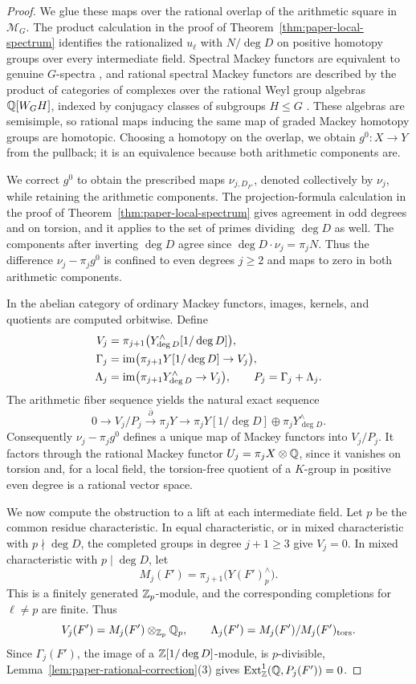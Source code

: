 \begin{proof}
We glue these maps over the rational overlap of the arithmetic square in $\mathscr M_G$.
The product calculation in the proof of Theorem~\ref{thm:paper-local-spectrum} identifies the rationalized $u_\ell$ with $N/\deg D$ on positive homotopy groups over every intermediate field.
Spectral Mackey functors are equivalent to genuine $G$-spectra \cite{BarwickSpectralMackey}, and rational spectral Mackey functors are described by the product of categories of complexes over the rational Weyl group algebras $\mathbb Q[W_GH]$, indexed by conjugacy classes of subgroups $H\le G$ \cite{BarnesRational2009}.
These algebras are semisimple, so rational maps inducing the same map of graded Mackey homotopy groups are homotopic.
Choosing a homotopy on the overlap, we obtain $g^0\colon X\to Y$ from the pullback; it is an equivalence because both arithmetic components are.

We correct $g^0$ to obtain the prescribed maps $\nu_{j,D_{F'}}$, denoted collectively by $\nu_j$, while retaining the arithmetic components.
The projection-formula calculation in the proof of Theorem~\ref{thm:paper-local-spectrum} gives agreement in odd degrees and on torsion, and it applies to the set of primes dividing $\deg D$ as well.
The components after inverting $\deg D$ agree since $\deg D\cdot\nu_j=\pi_jN$.
Thus the difference $\nu_j-\pi_jg^0$ is confined to even degrees $j\ge2$ and maps to zero in both arithmetic components.

In the abelian category of ordinary Mackey functors, images, kernels, and quotients are computed orbitwise.
Define
\[
 \begin{aligned}
 V_j&=\pi_{j+1}\bigl(Y^\wedge_{\deg D}[1/\deg D]\bigr),\\
 \Gamma_j&=\operatorname{im}\bigl(\pi_{j+1}Y[1/\deg D]\to V_j\bigr),\\
 \Lambda_j&=\operatorname{im}\bigl(\pi_{j+1}Y^\wedge_{\deg D}\to V_j\bigr),
 \qquad P_j=\Gamma_j+\Lambda_j.
 \end{aligned}
\]
The arithmetic fiber sequence yields the natural exact sequence
\[
 0\longrightarrow V_j/P_j
  \xrightarrow{\ \bar\partial\ }\pi_jY
  \longrightarrow\pi_jY[1/\deg D]\oplus\pi_jY^\wedge_{\deg D}.
\]
Consequently $\nu_j-\pi_jg^0$ defines a unique map of Mackey functors into $V_j/P_j$.
It factors through the rational Mackey functor $U_j=\pi_jX\otimes\mathbb Q$, since it vanishes on torsion and, for a local field, the torsion-free quotient of a $K$-group in positive even degree is a rational vector space.

We now compute the obstruction to a lift at each intermediate field.
Let $p$ be the common residue characteristic.
In equal characteristic, or in mixed characteristic with $p\nmid\deg D$, the completed groups in degree $j+1\ge3$ give $V_j=0$.
In mixed characteristic with $p\mid\deg D$, let
\[
 M_j(F')=\pi_{j+1}\bigl(Y(F')^\wedge_p\bigr).
\]
This is a finitely generated $\mathbb Z_p$-module, and the corresponding completions for $\ell\ne p$ are finite.
Thus
\[
 V_j(F')=M_j(F')\otimes_{\mathbb Z_p}\mathbb Q_p,\qquad
 \Lambda_j(F')=M_j(F')/M_j(F')_{\mathrm{tors}}.
\]
Since $\Gamma_j(F')$, the image of a $\mathbb Z[1/\deg D]$-module, is $p$-divisible, Lemma~\ref{lem:paper-rational-correction}(3) gives $\operatorname{Ext}^1_\mathbb Z(\mathbb Q,P_j(F'))=0$.


\end{proof}
